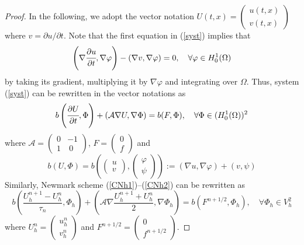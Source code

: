 \documentclass{imanum}
\begin{document}
\begin{proof}
In the following, we adopt the vector notation $U (t, x)
=\begin{pmatrix}
  u (t, x)\\
  v (t, x)
\end{pmatrix}$ where $v = {\partial u}/{\partial t}$. Note that the first equation in
(\ref{syst}) implies that
\[ \left(\nabla \cfrac{\partial u}{\partial t}, \nabla \varphi\right) - (\nabla v, \nabla \varphi) = 0,
   \quad \forall \varphi \in H^1_0 (\Omega) \]
by taking its gradient, multiplying it by $\nabla \varphi$ and integrating
over $\Omega$. Thus, system (\ref{syst}) can be rewritten in the vector
notations as
\begin{equation}
  {b} \left(\cfrac{\partial U}{\partial t}, \Phi\right) + \left(\mathcal{A} \nabla U, \nabla \Phi\right) = 
  {b} (F,\Phi), \quad  \forall \Phi \in (H^1_0 (\Omega))^2 \label{ODEf}
\end{equation}
where $\mathcal{A} = \begin{pmatrix}
  0 &- 1\\
  1&~0
\end{pmatrix}$, $F =\begin{pmatrix}
  0\\
  f
\end{pmatrix}$ and
$$ {b} ( U, \Phi)
 = {b}\left(\begin{pmatrix}u\\ v\end{pmatrix}, \begin{pmatrix} \varphi\\ \psi\end{pmatrix} \right)
:= (\nabla u, \nabla \varphi) + (v, \psi)
$$
Similarly, Newmark scheme (\ref{CNh1})--(\ref{CNh2}) can be rewritten as
\begin{equation}
  {b} \left( \frac{U_h^{n + 1} - U_h^n}{\tau_n}, \Phi_h \right) +
  \left( \mathcal{A} \nabla \frac{U_h^{n + 1} + U_h^n}{2}, \nabla \Phi_h \right) = 
  {b} \left(F^{n+1/2}, \Phi_h\right), \hspace{1em} \forall \Phi_h \in V_h^2
  \label{vectorScheme}
\end{equation}
where $U_h^n = \begin{pmatrix}
  u_h^n\\
  v_h^n
\end{pmatrix}$  and $F^{n+1/2} = \begin{pmatrix}
  0\\
  f^{n + 1/2}
\end{pmatrix}$.




\end{proof}
\end{document}
